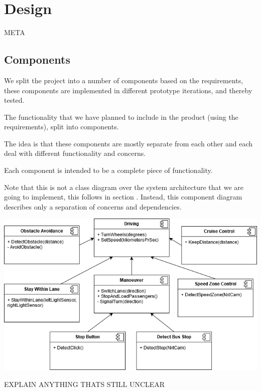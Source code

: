 \chapter{Design}
META

\section{Components}

We split the project into a number of components based on the requirements,  these components are implemented in different prototype iterations, and thereby tested. 



The functionality that we have planned to include in the product (using the requirements), split into components. 

The idea is that these components are mostly separate from each other and each deal with different functionality and concerns. 

Each component is intended to be a complete piece of functionality.

Note that this is not a class diagram over the system architecture that we are going to implement, this follows in section . Instead, this component diagram describes only a separation of concerns and dependencies.





%

\includegraphics{Images/Design/componentDiagram.png}

EXPLAIN ANYTHING THATS STILL UNCLEAR



